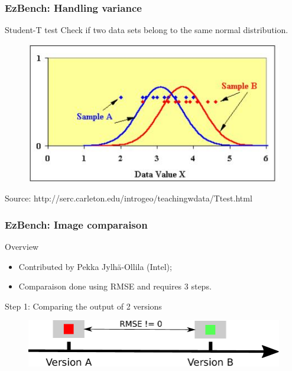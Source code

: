 \documentclass[11pt,english,compress]{beamer}
\begin{document}
\begin{frame}
	\frametitle{EzBench: Handling variance}
	
	\begin{block}{Student-T test}
		Check if two data sets belong to the same normal distribution.
		\begin{figure}%
			\centering
			\includegraphics{tTestImage.jpg}
		\end{figure}
		
		\tiny Source: http://serc.carleton.edu/introgeo/teachingwdata/Ttest.html
	\end{block}
\end{frame}

\begin{frame}
	\frametitle{EzBench: Image comparaison}

	\begin{block}{Overview}
		\begin{itemize}
			\item Contributed by Pekka Jylhä-Ollila (Intel);
			\item Comparaison done using RMSE and requires 3 steps.
		\end{itemize}
	\end{block}
	
	\pause
	
	\begin{block}{Step 1: Comparing the output of 2 versions}
		\begin{figure}%
			\centering
			\includegraphics[width=\textwidth]{img_diff_step_1.pdf}
		\end{figure}
	\end{block}
\end{frame}
\end{document}
